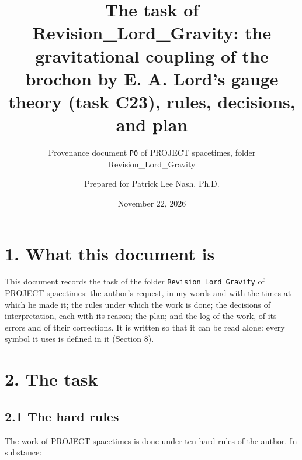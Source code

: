 \documentclass[
  10pt,
]{article}
\title{The task of Revision\_Lord\_Gravity: the gravitational coupling
of the brochon by E. A. Lord's gauge theory (task C23), rules,
decisions, and plan}
\subtitle{Provenance document \texttt{P0} of PROJECT spacetimes, folder
Revision\_Lord\_Gravity}
\author{Prepared for Patrick Lee Nash, Ph.D.}
\date{November 22, 2026}
\begin{document}
\maketitle

\hypertarget{what-this-document-is}{%
\section{1. What this document is}\label{what-this-document-is}}

This document records the task of the folder
\texttt{Revision\_Lord\_Gravity} of PROJECT spacetimes: the author's
request, in my words and with the times at which he made it; the rules
under which the work is done; the decisions of interpretation, each with
its reason; the plan; and the log of the work, of its errors and of
their corrections. It is written so that it can be read alone: every
symbol it uses is defined in it (Section 8).

\hypertarget{the-task}{%
\section{2. The task}\label{the-task}}

\hypertarget{the-hard-rules}{%
\subsection{2.1 The hard rules}\label{the-hard-rules}}

The work of PROJECT spacetimes is done under ten hard rules of the
author. In substance:
\end{document}
